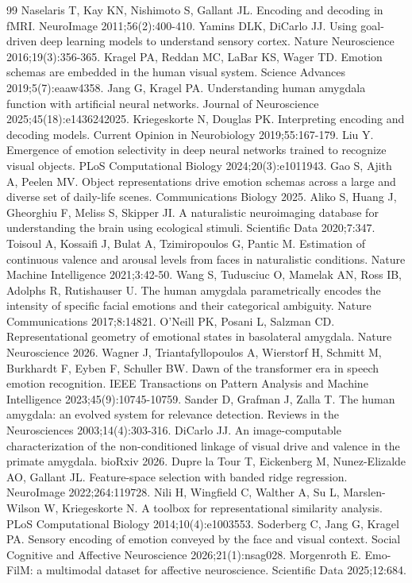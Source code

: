 \begin{thebibliography}{99}
 Naselaris T, Kay KN, Nishimoto S, Gallant JL. Encoding and decoding in fMRI. NeuroImage 2011;56(2):400-410.
 Yamins DLK, DiCarlo JJ. Using goal-driven deep learning models to understand sensory cortex. Nature Neuroscience 2016;19(3):356-365.
 Kragel PA, Reddan MC, LaBar KS, Wager TD. Emotion schemas are embedded in the human visual system. Science Advances 2019;5(7):eaaw4358.
 Jang G, Kragel PA. Understanding human amygdala function with artificial neural networks. Journal of Neuroscience 2025;45(18):e1436242025.
 Kriegeskorte N, Douglas PK. Interpreting encoding and decoding models. Current Opinion in Neurobiology 2019;55:167-179.
 Liu Y. Emergence of emotion selectivity in deep neural networks trained to recognize visual objects. PLoS Computational Biology 2024;20(3):e1011943.
 Gao S, Ajith A, Peelen MV. Object representations drive emotion schemas across a large and diverse set of daily-life scenes. Communications Biology 2025.
 Aliko S, Huang J, Gheorghiu F, Meliss S, Skipper JI. A naturalistic neuroimaging database for understanding the brain using ecological stimuli. Scientific Data 2020;7:347.
 Toisoul A, Kossaifi J, Bulat A, Tzimiropoulos G, Pantic M. Estimation of continuous valence and arousal levels from faces in naturalistic conditions. Nature Machine Intelligence 2021;3:42-50.
 Wang S, Tudusciuc O, Mamelak AN, Ross IB, Adolphs R, Rutishauser U. The human amygdala parametrically encodes the intensity of specific facial emotions and their categorical ambiguity. Nature Communications 2017;8:14821.
 O'Neill PK, Posani L, Salzman CD. Representational geometry of emotional states in basolateral amygdala. Nature Neuroscience 2026.
 Wagner J, Triantafyllopoulos A, Wierstorf H, Schmitt M, Burkhardt F, Eyben F, Schuller BW. Dawn of the transformer era in speech emotion recognition. IEEE Transactions on Pattern Analysis and Machine Intelligence 2023;45(9):10745-10759.
 Sander D, Grafman J, Zalla T. The human amygdala: an evolved system for relevance detection. Reviews in the Neurosciences 2003;14(4):303-316.
 DiCarlo JJ. An image-computable characterization of the non-conditioned linkage of visual drive and valence in the primate amygdala. bioRxiv 2026.
 Dupre la Tour T, Eickenberg M, Nunez-Elizalde AO, Gallant JL. Feature-space selection with banded ridge regression. NeuroImage 2022;264:119728.
 Nili H, Wingfield C, Walther A, Su L, Marslen-Wilson W, Kriegeskorte N. A toolbox for representational similarity analysis. PLoS Computational Biology 2014;10(4):e1003553.
 Soderberg C, Jang G, Kragel PA. Sensory encoding of emotion conveyed by the face and visual context. Social Cognitive and Affective Neuroscience 2026;21(1):nsag028.
 Morgenroth E. Emo-FilM: a multimodal dataset for affective neuroscience. Scientific Data 2025;12:684.
\end{thebibliography}
